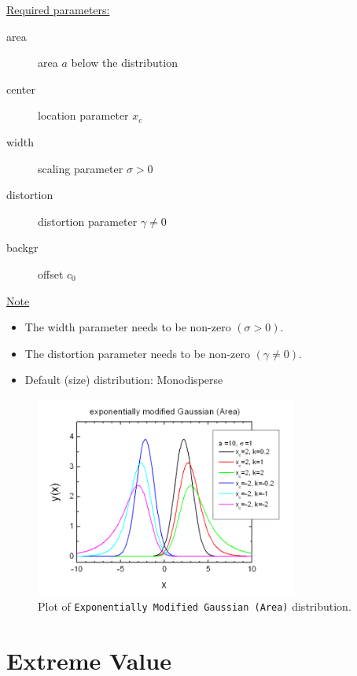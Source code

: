 \vspace{5mm}

\underline{Required parameters:}
\begin{description}
    \item[area] area $a$ below the distribution
    \item[center] location parameter $x_c$
    \item[width] scaling parameter $\sigma> 0$
    \item[distortion] distortion parameter $\gamma\neq 0$
    \item[backgr] offset $c_0$
\end{description}

\underline{Note}
\begin{itemize}
  \item The width parameter needs to be non-zero $(\sigma> 0)$.
  \item The distortion parameter needs to be non-zero $(\gamma \neq 0)$.
  \item Default (size) distribution: Monodisperse
\end{itemize}
\begin{figure}[htb]
\begin{center}
\includegraphics[width=0.768\textwidth]{EMGArea.png}
\end{center}
\caption{Plot of \texttt{Exponentially Modified Gaussian (Area)} distribution.}
\label{fig:EMGArea}
\end{figure}

\clearpage

\section{Extreme Value} ~\\
\label{sec:ExtremeValue}
